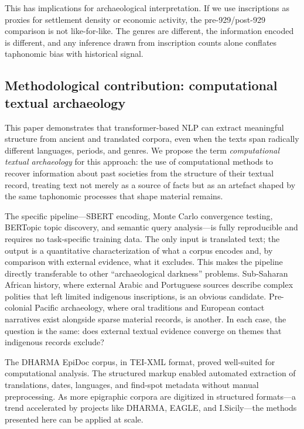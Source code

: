 \documentclass[12pt]{article}
\begin{document}
This has implications for archaeological interpretation.
If we use inscriptions as proxies for settlement density or economic activity, the pre-929/post-929 comparison is not like-for-like.
The genres are different, the information encoded is different, and any inference drawn from inscription counts alone conflates taphonomic bias with historical signal.

\subsection{Methodological contribution: computational textual archaeology}

This paper demonstrates that transformer-based NLP can extract meaningful structure from ancient and translated corpora, even when the texts span radically different languages, periods, and genres.
We propose the term \emph{computational textual archaeology} for this approach: the use of computational methods to recover information about past societies from the structure of their textual record, treating text not merely as a source of facts but as an artefact shaped by the same taphonomic processes that shape material remains.

The specific pipeline---SBERT encoding, Monte Carlo convergence testing, BERTopic topic discovery, and semantic query analysis---is fully reproducible and requires no task-specific training data.
The only input is translated text; the output is a quantitative characterization of what a corpus encodes and, by comparison with external evidence, what it excludes.
This makes the pipeline directly transferable to other ``archaeological darkness'' problems.
Sub-Saharan African history, where external Arabic and Portuguese sources describe complex polities that left limited indigenous inscriptions, is an obvious candidate.
Pre-colonial Pacific archaeology, where oral traditions and European contact narratives exist alongside sparse material records, is another.
In each case, the question is the same: does external textual evidence converge on themes that indigenous records exclude?

The DHARMA EpiDoc corpus, in TEI-XML format, proved well-suited for computational analysis.
The structured markup enabled automated extraction of translations, dates, languages, and find-spot metadata without manual preprocessing.
As more epigraphic corpora are digitized in structured formats---a trend accelerated by projects like DHARMA, EAGLE, and I.Sicily---the methods presented here can be applied at scale.
\end{document}
